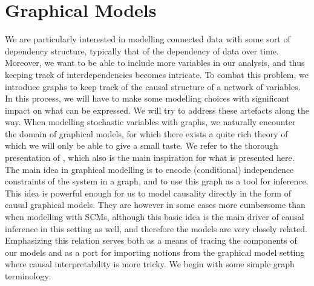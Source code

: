 \documentclass[11pt, a4paper]{memoir}
\theoremstyle{break}
\theoremstyle{break}
\theoremstyle{nonumberplain}
\begin{document}
\section{Graphical Models}
We are particularly interested in modelling connected data with some sort of dependency structure, typically that of the dependency of data over time. Moreover, we want to be able to include more variables in our analysis, and thus keeping track of interdependencies becomes intricate. To combat this problem, we introduce graphs to keep track of the causal structure of a network of variables. In this process, we will have to make some modelling choices with significant impact on what can be expressed. We will try to address these artefacts along the way. When modelling stochastic variables with graphs, we naturally encounter the domain of graphical models, for which there exists a quite rich theory of which we will only be able to give a small taste. We refer to the thorough presentation of \cite{Steffen}, which also is the main inspiration for what is presented here. The main idea in graphical modelling is to encode (conditional) independence constraints of the system in a graph, and to use this graph as a tool for inference. This idea is powerful enough for us to model causality directly in the form of causal graphical models. They are however in some cases more cumbersome than when modelling with SCMs, although this basic idea is the main driver of causal inference in this setting as well, and therefore the models are very closely related. Emphasizing this relation serves both as a means of tracing the components of our models and as a port for importing notions from the graphical model setting where causal interpretability is more tricky. We begin with some simple graph terminology:
\end{document}
